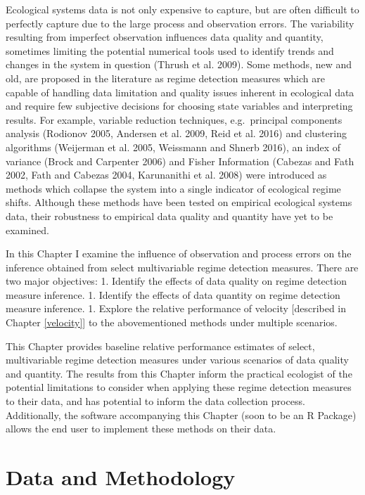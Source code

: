 \documentclass[12pt,twoside,openany]{reedthesis}
\begin{document}
Ecological systems data is not only expensive to capture, but are often
difficult to perfectly capture due to the large process and observation
errors. The variability resulting from imperfect observation influences
data quality and quantity, sometimes limiting the potential numerical
tools used to identify trends and changes in the system in question
(Thrush et al. 2009). Some methods, new and old, are proposed in the
literature as regime detection measures which are capable of handling
data limitation and quality issues inherent in ecological data and
require few subjective decisions for choosing state variables and
interpreting results. For example, variable reduction techniques,
e.g.~principal components analysis (Rodionov 2005, Andersen et al. 2009,
Reid et al. 2016) and clustering algorithms (Weijerman et al. 2005,
Weissmann and Shnerb 2016), an index of variance (Brock and Carpenter
2006) and Fisher Information (Cabezas and Fath 2002, Fath and Cabezas
2004, Karunanithi et al. 2008) were introduced as methods which collapse
the system into a single indicator of ecological regime shifts. Although
these methods have been tested on empirical ecological systems data,
their robustness to empirical data quality and quantity have yet to be
examined.

In this Chapter I examine the influence of observation and process
errors on the inference obtained from select multivariable regime
detection measures. There are two major objectives: 1. Identify the
effects of data quality on regime detection measure inference. 1.
Identify the effects of data quantity on regime detection measure
inference. 1. Explore the relative performance of velocity {[}described
in Chapter \ref{velocity}{]} to the abovementioned methods under
multiple scenarios.

This Chapter provides baseline relative performance estimates of select,
multivariable regime detection measures under various scenarios of data
quality and quantity. The results from this Chapter inform the practical
ecologist of the potential limitations to consider when applying these
regime detection measures to their data, and has potential to inform the
data collection process. Additionally, the software accompanying this
Chapter (soon to be an R Package) allows the end user to implement these
methods on their data.

\section{Data and Methodology}\label{data-and-methodology}
\end{document}
